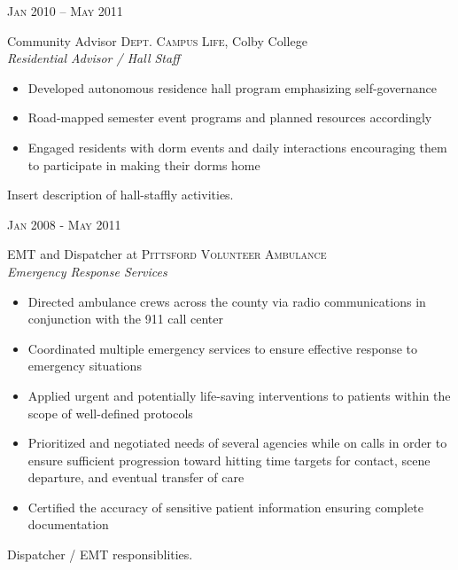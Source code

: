 \documentclass[10pt]{article} %
\begin{document}
{\begin{minipage}[t]{0.5\textwidth}
{\raggedleft\textsc{Jan 2010 -- May 2011}\par}

{\raggedright\large Community Advisor \textsc{Dept. Campus Life}, Colby College\\
\textit{Residential Advisor / Hall Staff}\\[5pt]}
\begin{itemize}
  \item Developed autonomous residence hall program emphasizing self-governance
  \item Road-mapped semester event programs and planned resources accordingly
  \item Engaged residents with dorm events and daily interactions encouraging them to participate in making their dorms home
\end{itemize}

\normalsize{Insert description of hall-staffly activities.}


{\raggedleft\textsc{Jan 2008 - May 2011}\par}

{\raggedright\large EMT and Dispatcher at \textsc{Pittsford Volunteer Ambulance}\\
\textit{Emergency Response Services}\\[5pt]}
\begin{itemize}
  \item Directed ambulance crews across the county via radio communications in conjunction with the 911 call center
  \item Coordinated multiple emergency services to ensure effective response to emergency situations
  \item Applied urgent and potentially life-saving interventions to patients within the scope of well-defined protocols
  \item Prioritized and negotiated needs of several agencies while on calls in order to ensure sufficient progression toward hitting time targets for contact, scene departure, and eventual transfer of care
  \item Certified the accuracy of sensitive patient information ensuring complete documentation
\end{itemize}

\normalsize{Dispatcher / EMT responsiblities.}



\end{minipage}}
\end{document}
